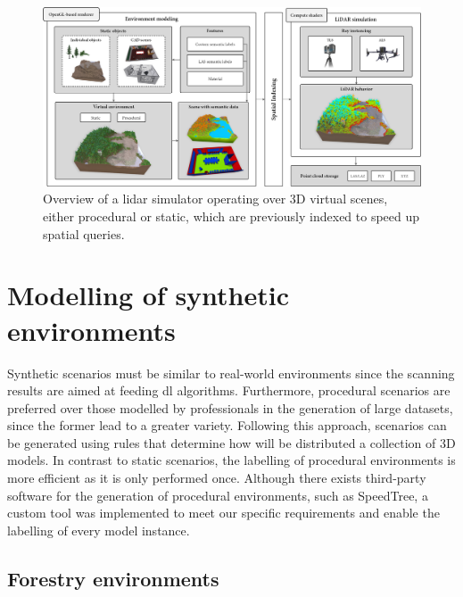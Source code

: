 \begin{figure}
    \centering
    \includegraphics[width=\linewidth]{figs/lidar_simulation/overview.png}
	\caption{Overview of a \acrshort{lidar} simulator operating over 3D virtual scenes, either procedural or static, which are previously indexed to speed up spatial queries. }
	\label{fig:lidar_overview}
\end{figure}

\section{Modelling of synthetic environments}

Synthetic scenarios must be similar to real-world environments since the scanning results are aimed at feeding \acrshort{dl} algorithms. Furthermore, procedural scenarios are preferred over those modelled by professionals in the generation of large datasets, since the former lead to a greater variety. Following this approach, scenarios can be generated using rules that determine how will be distributed a collection of 3D models. In contrast to static scenarios, the labelling of procedural environments is more efficient as it is only performed once. Although there exists third-party software for the generation of procedural environments, such as SpeedTree\textregistered, a custom tool was implemented to meet our specific requirements and enable the labelling of every model instance. 

\newpage
\subsection{Forestry environments}

